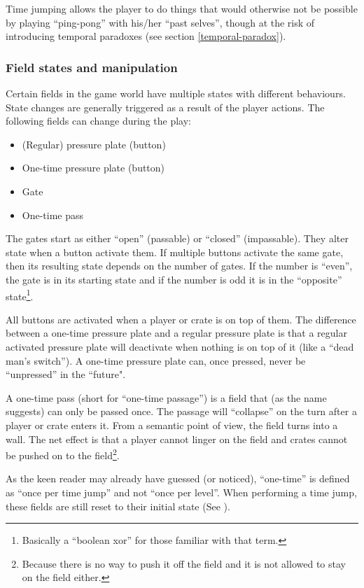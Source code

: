 Time jumping allows the player to do things that would otherwise not
be possible by playing ``ping-pong'' with his/her ``past selves'',
though at the risk of introducing temporal paradoxes (see
section \ref{temporal-paradox}).

\subsubsection{Field states and manipulation}
\label{field-states}
Certain fields in the game world have multiple states with different
behaviours.  State changes are generally triggered as a result of the
player actions.  The following fields can change during the play:

\begin{itemize}
\item (Regular) pressure plate (button)
\item One-time pressure plate (button)
\item Gate
\item One-time pass
\end{itemize}

The gates start as either ``open'' (passable) or ``closed''
(impassable).  They alter state when a button activate them.  If
multiple buttons activate the same gate, then its resulting state
depends on the number of gates.  If the number is ``even'', the
gate is in its starting state and if the number is odd it is in the
``opposite'' state\footnote{Basically a ``boolean xor'' for those
  familiar with that term.}.

All buttons are activated when a player or crate is on top of them.
The difference between a one-time pressure plate and a regular
pressure plate is that a regular activated pressure plate will
deactivate when nothing is on top of it (like a ``dead man's
switch'').  A one-time pressure plate can, once pressed, never be
``unpressed'' in the ``future".

A one-time pass (short for ``one-time passage'') is a field that
(as the name suggests) can only be passed once.  The passage will
``collapse'' on the turn after a player or crate enters it.  From a
semantic point of view, the field turns into a wall.  The net effect
is that a player cannot linger on the field and crates cannot be pushed
on to the field\footnote{Because there is no way to push it off the field
and it is not allowed to stay on the field either.}.

As the keen reader may already have guessed (or noticed), ``one-time''
is defined as ``once per time jump'' and not ``once per level''.  When
performing a time jump, these fields are still reset to their initial
state (See ).



